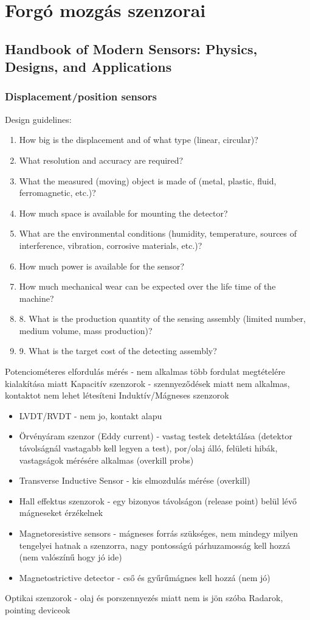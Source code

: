 \documentclass{article}
\begin{document}
	
	
	\section{Forgó mozgás szenzorai}
	
	\subsection{Handbook of Modern Sensors: Physics, Designs, and Applications}
	\subsubsection{Displacement/position sensors}
	Design guidelines:
	\begin{enumerate}
		\item How big is the displacement and of what type (linear, circular)?
		\item What resolution and accuracy are required?
		\item What the measured (moving) object is made of (metal, plastic, fluid, ferromagnetic, etc.)?
		\item How much space is available for mounting the detector?
		\item What are the environmental conditions (humidity, temperature, sources of
		interference, vibration, corrosive materials, etc.)?
		\item How much power is available for the sensor?
		\item How much mechanical wear can be expected over the life time of the machine?
		\item 8. What is the production quantity of the sensing assembly (limited number,
		medium volume, mass production)?
		\item 9. What is the target cost of the detecting assembly?
	\end{enumerate}
	
	Potenciométeres elfordulás mérés - nem alkalmas több fordulat megtételére kialakítása miatt
	Kapacitív szenzorok - szennyeződések miatt nem alkalmas, kontaktot nem lehet létesíteni
	Induktív/Mágneses szenzorok
	\begin{itemize}
		\item LVDT/RVDT - nem jo, kontakt alapu
		\item Örvényáram szenzor (Eddy current) - vastag testek detektálása (detektor távolságnál vastagabb kell legyen a test), por/olaj álló, felületi hibák, vastagságok mérésére alkalmas (overkill probs)
		\item Transverse Inductive Sensor - kis elmozdulás mérése (overkill)
		\item Hall effektus szenzorok - egy bizonyos távolságon (release point) belül lévő mágneseket érzékelnek
		\item Magnetoresistive sensors - mágneses forrás szükséges, nem mindegy milyen tengelyei hatnak a szenzorra, nagy pontosságú párhuzamosság kell hozzá (nem valószínű hogy jó ide)
		\item Magnetostrictive detector - cső és gyűrűmágnes kell hozzá (nem jó)
	\end{itemize}
	Optikai szenzorok - olaj és porszennyezés miatt nem is jön szóba
	Radarok, pointing deviceok
	
\end{document}
